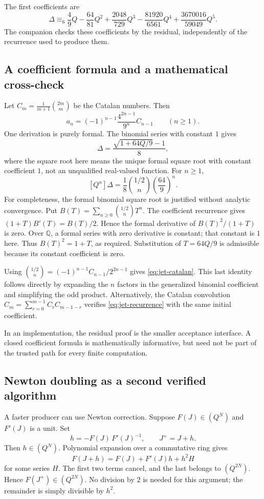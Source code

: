 \documentclass[11pt,letterpaper]{article}
\newcommand{\Q}{\mathbb Q}
\theoremstyle{definition}
\theoremstyle{remark}
\begin{document}
The first coefficients are
\begin{equation}
 \Delta\equiv_6
 \frac49Q-\frac{64}{81}Q^2+\frac{2048}{729}Q^3
 -\frac{81920}{6561}Q^4+\frac{3670016}{59049}Q^5.
 \label{eq:jet-values}
\end{equation}
The companion checks these coefficients by the residual, independently of the
recurrence used to produce them.

\subsection{A coefficient formula and a mathematical cross-check}
Let $C_m=\frac1{m+1}\binom{2m}{m}$ be the Catalan numbers. Then
\begin{equation}
 a_n=(-1)^{n-1}\frac{4^{2n-1}}{9^n}C_{n-1}\qquad(n\geq1).
 \label{eq:jet-catalan}
\end{equation}
One derivation is purely formal. The binomial series with constant $1$ gives
\[
 \Delta=\frac{\sqrt{1+64Q/9}-1}{8},
\]
where the square root here means the unique formal square root with constant
coefficient $1$, not an unqualified real-valued function. For $n\geq1$,
\[
 [Q^n]\Delta=\frac18\binom{1/2}{n}\left(\frac{64}{9}\right)^n.
\]
For completeness, the formal binomial square root is justified without
analytic convergence. Put $B(T)=\sum_{n\geq0}\binom{1/2}{n}T^n$.
The coefficient recurrence gives $(1+T)B'(T)=B(T)/2$.
Hence the formal derivative of $B(T)^2/(1+T)$ is zero. Over $\Q$, a formal
series with zero derivative is constant; that constant is $1$ here.
Thus $B(T)^2=1+T$, as required. Substitution of $T=64Q/9$ is admissible
because its constant coefficient is zero.

Using
$\binom{1/2}{n}=(-1)^{n-1}C_{n-1}/2^{2n-1}$ gives
\eqref{eq:jet-catalan}. This last identity follows directly by expanding the
$n$ factors in the generalized binomial coefficient and simplifying the odd
product. Alternatively, the Catalan convolution
$C_m=\sum_{r=0}^{m-1}C_rC_{m-1-r}$ verifies \eqref{eq:jet-recurrence} with the
same initial coefficient.

In an implementation, the residual proof is the smaller acceptance interface.
A closed coefficient formula is mathematically informative, but need not be
part of the trusted path for every finite computation.

\subsection{Newton doubling as a second verified algorithm}
A faster producer can use Newton correction. Suppose $F(J)\in(Q^N)$ and
$F'(J)$ is a unit. Set
\[
 h=-F(J)\,F'(J)^{-1},\qquad J^+=J+h.
\]
Then $h\in(Q^N)$. Polynomial expansion over a commutative ring gives
\[
 F(J+h)=F(J)+F'(J)h+h^2H
\]
for some series $H$. The first two terms cancel, and the last belongs to
$(Q^{2N})$. Hence $F(J^+)\in(Q^{2N})$. No division by $2$ is needed for this
argument; the remainder is simply divisible by $h^2$.
\end{document}
